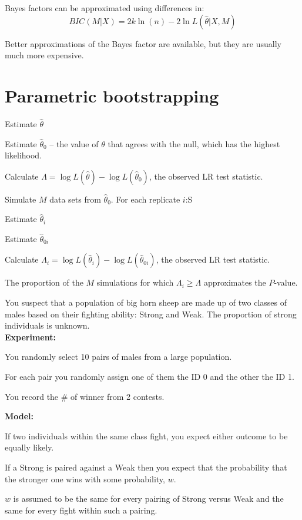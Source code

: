 \documentclass[landscape]{foils}
\begin{document}
\myNewSlide
Bayes factors can be approximated using differences in:
  $$BIC(M|X) = 2k\ln(n) - 2 \ln L(\hat\theta | X, M)$$

Better approximations of the Bayes factor are available, but they are usually much more expensive.
\myNewSlide
\section*{Parametric bootstrapping}
\begin{compactenum}
  \item Estimate $\hat{\theta}$
  \item Estimate $\hat{\theta}_0$ -- the value of $\theta$ that agrees with the
    null, which has the highest likelihood.
  \item Calculate $\Lambda = \log L(\hat{\theta}) - \log L(\hat{\theta}_0)$, the observed LR test statistic.
  \item Simulate $M$ data sets from $\hat{\theta}_0$. For each replicate $i$:S
    \begin{compactenum}
      \item Estimate $\hat{\theta}_i$
      \item Estimate $\hat{\theta}_{0i}$
      \item Calculate $\Lambda_i = \log L(\hat{\theta}_i) - \log L(\hat{\theta}_{0i})$, the observed LR test statistic.
    \end{compactenum}  
\end{compactenum}

The proportion of the $M$ simulations for which $\Lambda_i \geq \Lambda$ approximates the $P$-value.

\myNewSlide
\normalsize
You suspect that a population of big horn sheep are made up of two classes of males based on their fighting ability: Strong and Weak. The proportion of strong individuals is unknown.\\ {\bf Experiment:}
\begin{compactitem}
  \item You randomly select 10 pairs of males from a large population. 
  \item For each pair you randomly assign one of them the ID 0 and the other the ID 1.  
  \item You record the \# of winner from 2 contests.
\end{compactitem}
{\bf Model:}
\begin{compactitem}
  \item If two individuals within the same class fight, you expect either outcome to be equally likely.
  \item If a Strong is paired against a Weak then you expect that the probability that the stronger one wins with some probability, $w$.
  \item $w$ is assumed to be the same for every pairing of Strong {versus} Weak and the same for every fight within such a pairing.
\end{compactitem}
\end{document}
